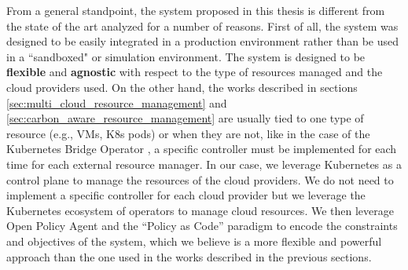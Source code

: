 From a general standpoint, the system proposed in this thesis is different from the state of the art analyzed for a number of reasons.
First of all, the system was designed to be easily integrated in a production environment rather than be used in a ``sandboxed" or simulation environment.
The system is designed to be \textbf{flexible} and \textbf{agnostic} with respect to the type of resources managed and the cloud providers used.
On the other hand, the works described in sections \ref{sec:multi_cloud_resource_management} and  \ref{sec:carbon_aware_resource_management} are usually tied to one type of resource (e.g., VMs, K8s pods) or when they are not, like in the case of the Kubernetes Bridge Operator \cite{lublinsky2022kubernetesbridgeoperatorcloud}, a specific controller must be implemented for each time for each external resource manager.
In our case, we leverage Kubernetes as a control plane to manage the resources of the cloud providers.
We do not need to implement a specific controller for each cloud provider but we leverage the Kubernetes ecosystem of operators to manage cloud resources.
We then leverage Open Policy Agent and the ``Policy as Code'' paradigm to encode the constraints and objectives of the system, which we believe is a more flexible and powerful approach than the one used in the works described in the previous sections.

\newpage
